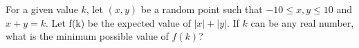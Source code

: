 For a given value $k$, let $(x, y)$ be a random point such that $-10 \le  x, y \le 10$ and $x + y = k$. Let f(k) be the expected value of $|x| + |y|$. If $k$ can be any real number, what is the minimum possible value of $f(k)$?
